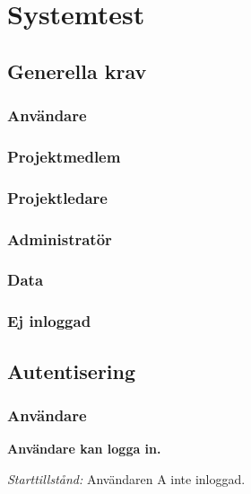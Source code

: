 \documentclass[a4paper]{article}
\begin{document}
\section{Systemtest}
\begin{ST}


\subsection{Generella krav}


\subsubsection{Användare}
\subsubsection{Projektmedlem}
\subsubsection{Projektledare}
\subsubsection{Administratör}
\subsubsection{Data}
\subsubsection{Ej inloggad}



\subsection{Autentisering}


\subsubsection{Användare}

\item
\textbf{Användare kan logga in.}

\emph{Starttillstånd:} Användaren A inte inloggad.


\end{ST}
\end{document}
